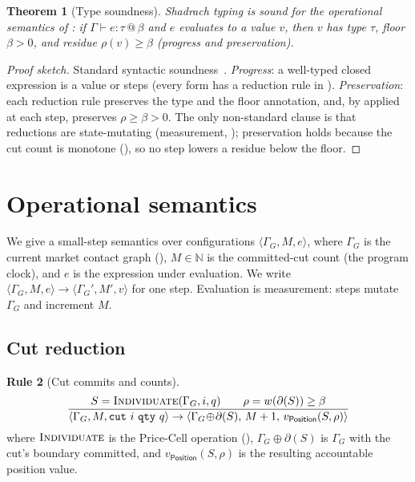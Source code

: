\documentclass[11pt,a4paper]{article}
\theoremstyle{thmstyle}
\newtheorem{theorem}{Theorem}[section]
\theoremstyle{definition}
\newtheorem{rulename}[theorem]{Rule}
\theoremstyle{remark}
\newcommand{\N}{\mathbb{N}}
\newcommand{\Gph}{\Gamma}
\newcommand{\wt}{w}
\newcommand{\flo}{\beta}
\newcommand{\res}{\rho}
\newcommand{\cut}{\partial}
\newcommand{\sh}[1]{\texttt{#1}}
\begin{document}
\begin{theorem}[Type soundness]
\label{thm:soundness}
Shadrach typing is sound for the operational semantics of
: if $\Gamma\vdash e:\tau\,@\,\flo$ and $e$ evaluates to
a value $v$, then $v$ has type $\tau$, floor $\flo>0$, and residue
$\res(v)\ge\flo$ (progress and preservation).
\end{theorem}

\begin{proof}[Proof sketch]
Standard syntactic soundness~\citep{pierce2002,wright1994}.
\emph{Progress}: a well-typed closed expression is a value or steps
(every form has a reduction rule in ). \emph{Preservation}:
each reduction rule preserves the type and the floor annotation, and,
by  applied at each step, preserves
$\res\ge\flo>0$. The only non-standard clause is that reductions are
state-mutating (measurement, ); preservation holds
because the cut count is monotone (), so no step
lowers a residue below the floor.
\end{proof}

\section{Operational semantics}
\label{sec:opsem}

We give a small-step semantics over configurations
$\langle\Gph_G,M,e\rangle$, where $\Gph_G$ is the current market contact
graph (), $M\in\N$ is the committed-cut count
(the program clock), and $e$ is the expression under evaluation. We
write $\langle\Gph_G,M,e\rangle\to\langle\Gph_G',M',v\rangle$ for one
step. Evaluation is measurement: steps mutate $\Gph_G$ and increment
$M$.

\subsection{Cut reduction}

\begin{rulename}[Cut commits and counts]
\label{rule:cut-step}
\[
\frac{S=\textsc{Individuate}(\Gph_G,i,q)\qquad
      \res=\wt(\cut(S))\ge\flo}
     {\langle\Gph_G,M,\sh{cut}\ i\ \sh{qty}\ q\rangle\to
      \langle\Gph_G\!\oplus\!\cut(S),\,M+1,\,
      v_{\mathsf{Position}}(S,\res)\rangle}
\]
where $\textsc{Individuate}$ is the Price-Cell operation
(), $\Gph_G\!\oplus\!\cut(S)$ is $\Gph_G$ with
the cut's boundary committed, and $v_{\mathsf{Position}}(S,\res)$ is the
resulting accountable position value.
\end{rulename}
\end{document}
